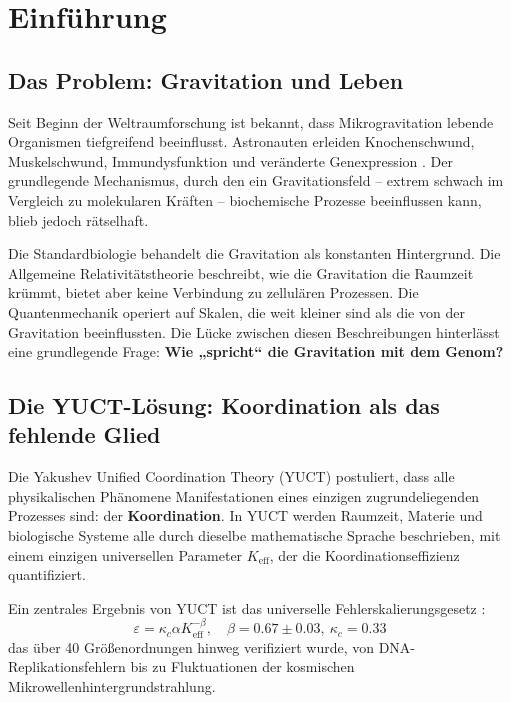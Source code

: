 \documentclass[12pt,a4paper]{article}
\theoremstyle{remark}
\newcommand{\Keff}{K_{\mathrm{eff}}}
\newcommand{\kappac}{\kappa_c}
\newcommand{\eps}{\varepsilon}
\begin{document}
	\tableofcontents
	\newpage
	
	\section{Einführung}
	\label{sec:intro}
	
	\subsection{Das Problem: Gravitation und Leben}
	
	Seit Beginn der Weltraumforschung ist bekannt, dass Mikrogravitation lebende Organismen tiefgreifend beeinflusst. Astronauten erleiden Knochenschwund, Muskelschwund, Immundysfunktion und veränderte Genexpression \cite{NASA-GeneLab, SpaceX-2023}. Der grundlegende Mechanismus, durch den ein Gravitationsfeld – extrem schwach im Vergleich zu molekularen Kräften – biochemische Prozesse beeinflussen kann, blieb jedoch rätselhaft.
	
	Die Standardbiologie behandelt die Gravitation als konstanten Hintergrund. Die Allgemeine Relativitätstheorie beschreibt, wie die Gravitation die Raumzeit krümmt, bietet aber keine Verbindung zu zellulären Prozessen. Die Quantenmechanik operiert auf Skalen, die weit kleiner sind als die von der Gravitation beeinflussten. Die Lücke zwischen diesen Beschreibungen hinterlässt eine grundlegende Frage: \textbf{Wie „spricht“ die Gravitation mit dem Genom?}
	
	\subsection{Die YUCT-Lösung: Koordination als das fehlende Glied}
	
	Die Yakushev Unified Coordination Theory (YUCT) postuliert, dass alle physikalischen Phänomene Manifestationen eines einzigen zugrundeliegenden Prozesses sind: der \textbf{Koordination}. In YUCT werden Raumzeit, Materie und biologische Systeme alle durch dieselbe mathematische Sprache beschrieben, mit einem einzigen universellen Parameter \(\Keff\), der die Koordinationseffizienz quantifiziert.
	
	Ein zentrales Ergebnis von YUCT ist das universelle Fehlerskalierungsgesetz \cite{AppendixL}:
	\begin{equation}
		\eps = \kappac \alpha \Keff^{-\beta}, \quad \beta = 0.67 \pm 0.03,\ \kappac = 0.33
		\label{eq:universal-scaling}
	\end{equation}
	das über 40 Größenordnungen hinweg verifiziert wurde, von DNA-Replikationsfehlern bis zu Fluktuationen der kosmischen Mikrowellenhintergrundstrahlung.
	
\end{document}

